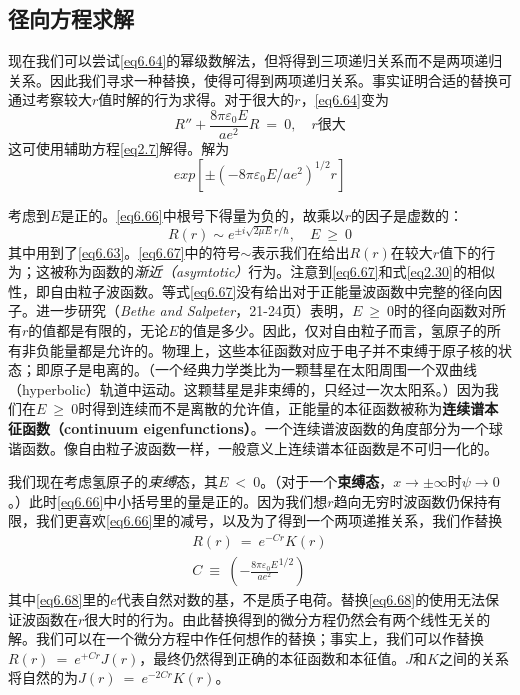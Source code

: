 \documentclass[12pt,a4paper,openany]{ctexbook}
\begin{document}
\subsection{径向方程求解}
\begin{flushleft}
    \setlength{\parindent}{2em}
现在我们可以尝试\eqref{eq6.64}的幂级数解法，但将得到三项递归关系而不是两项递归关系。因此我们寻求一种替换，使得可得到两项递归关系。事实证明合适的替换可通过考察较大$r$值时解的行为求得。对于很大的$r$，\eqref{eq6.64}变为
\begin{equation}
    R''+\frac{8\pi\varepsilon_0E}{ae^2}R\ =\ 0,\quad r\text{很大} \label{eq6.65}
\end{equation}
这可使用辅助方程\eqref{eq2.7}解得。解为
\begin{equation}
    exp[\pm(-8\pi\varepsilon_0E/ae^2)^{1/2}r] \label{eq6.66}
\end{equation}

考虑到$E$是正的。\eqref{eq6.66}中根号下得量为负的，故乘以$r$的因子是虚数的：
\begin{equation}
    R(r) \sim e^{\pm i\sqrt{2\mu E}r/\hbar},\quad E\ \geq\ 0 \label{eq6.67}
\end{equation}
其中用到了\eqref{eq6.63}。\eqref{eq6.67}中的符号$\sim$表示我们在给出$R(r)$在较大$r$值下的行为；这被称为函数的\textit{渐近（asymtotic）}行为。注意到\eqref{eq6.67}和式\eqref{eq2.30}的相似性，即自由粒子波函数。等式\eqref{eq6.67}没有给出对于正能量波函数中完整的径向因子。进一步研究（\textit{Bethe and Salpeter}，21-24页）表明，$E\ \geq\ 0$时的径向函数对所有$r$的值都是有限的，无论$E$的值是多少。因此，仅对自由粒子而言，氢原子的所有非负能量都是允许的。物理上，这些本征函数对应于电子并不束缚于原子核的状态；即原子是电离的。（一个经典力学类比为一颗彗星在太阳周围一个双曲线（hyperbolic）轨道中运动。这颗彗星是非束缚的，只经过一次太阳系。）因为我们在$E\ \geq\ 0$时得到连续而不是离散的允许值，正能量的本征函数被称为\textbf{连续谱本征函数（continuum eigenfunctions）}。一个连续谱波函数的角度部分为一个球谐函数。像自由粒子波函数一样，一般意义上连续谱本征函数是不可归一化的。

我们现在考虑氢原子的\textit{束缚}态，其$E\ <\ 0$。（对于一个\textbf{束缚态}，$x\to\pm\infty$时$\psi\to 0$。）此时\eqref{eq6.66}中小括号里的量是正的。因为我们想$r$趋向无穷时波函数仍保持有限，我们更喜欢\eqref{eq6.66}里的减号，以及为了得到一个两项递推关系，我们作替换
\begin{gather}
    R(r)\ =\ e^{-Cr}K(r) \label{eq6.68} \\
    C\ \equiv\ (-\frac{8\pi\varepsilon_0E}{ae^2}^{1/2}) \label{eq6.69}
\end{gather}
其中\eqref{eq6.68}里的$e$代表自然对数的基，不是质子电荷。替换\eqref{eq6.68}的使用无法保证波函数在$r$很大时的行为。由此替换得到的微分方程仍然会有两个线性无关的解。我们可以在一个微分方程中作任何想作的替换；事实上，我们可以作替换$R(r)\ =\ e^{+Cr}J(r)$，最终仍然得到正确的本征函数和本征值。$J$和$K$之间的关系将自然的为$J(r)\ =\ e^{-2Cr}K(r)$。


\end{flushleft}
\end{document}
